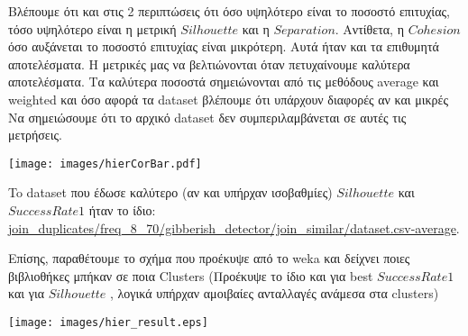 Βλέπουμε ότι και στις 2 περιπτώσεις ότι όσο υψηλότερο είναι το ποσοστό επιτυχίας,
τόσο υψηλότερο είναι η μετρική $Silhouette$ και η $Separation$.
Αντίθετα, η $Cohesion$ όσο αυξάνεται το ποσοστό επιτυχίας είναι μικρότερη.
Αυτά ήταν και τα επιθυμητά αποτελέσματα.
Η μετρικές μας να βελτιώνονται όταν πετυχαίνουμε καλύτερα αποτελέσματα. 
Τα καλύτερα ποσοστά σημειώνονται από τις μεθόδους average και weighted
και όσο αφορά τα dataset βλέπουμε ότι υπάρχουν διαφορές αν και μικρές
Να σημειώσουμε ότι το αρχικό dataset δεν συμπεριλαμβάνεται σε αυτές τις μετρήσεις.

\noindent\begin{minipage}{\linewidth}
    \centering
    \texttt{[image: images/hierCorBar.pdf]}
    \label{fig:CorrelationHier}
\end{minipage}

To dataset που έδωσε καλύτερο (αν και υπήρχαν ισοβαθμίες) $Silhouette$ και $Success Rate 1$ ήταν το ίδιο:
\url{join_duplicates/freq_8_70/gibberish_detector/join_similar/dataset.csv-average}.

\begin{minipage}{\linewidth}
    \centering
    \label{table:best-hier}
\end{minipage}

Επίσης, παραθέτουμε το σχήμα που προέκυψε από το weka και δείχνει ποιες
βιβλιοθήκες μπήκαν σε ποια Clusters (Προέκυψε το ίδιο και για best $Success Rate 1$ και για $Silhouette$ , λογικά υπήρχαν αμοιβαίες ανταλλαγές ανάμεσα στα clusters)

\noindent\begin{minipage}{\linewidth}
    \centering
    \texttt{[image: images/hier\_result.eps]}
    \label{fig:clustering}
\end{minipage}

